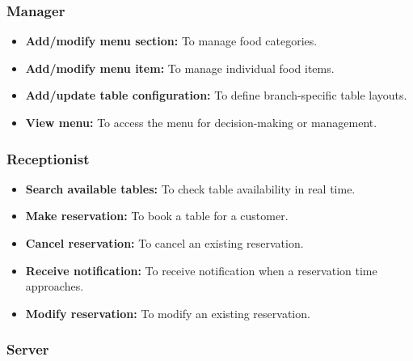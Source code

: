 \subsubsection{Manager}\label{jgQsx495o6YJeOs4ce3vR}

\begin{itemize}
\item
\protect{}\label{5SGHT-CP0vpDz7Rw-SgeX}
\textbf{Add/modify menu section:} To manage food categories.
\item
\protect{}\label{_JZ66uNrzo9X8_sIN7jDQ}
\textbf{Add/modify menu item:} To manage individual food items.
\item
\protect{}\label{HjCiYsiJg2OsqkMC9UfKi}
\textbf{Add/update table configuration:} To define branch-specific table layouts.
\item
\protect{}\label{zDsKv5REEl-dg4h41iT51}
\textbf{View menu:} To access the menu for decision-making or management.
\end{itemize}

\subsubsection{Receptionist}\label{fA9KqAqMr9W1m9H0SJjck}

\begin{itemize}
\item
\protect{}\label{Qt6iuvdptA9ENNh14ioHK}
\textbf{Search available tables:} To check table availability in real time.
\item
\protect{}\label{-F8HXIsH_SrwmAZCqnrOQ}
\textbf{Make reservation:} To book a table for a customer.
\item
\protect{}\label{MzsGDsfxMHckXuqGziL59}
\textbf{Cancel reservation:} To cancel an existing reservation.
\item
\protect{}\label{Vqa1_6BgGIILAR9Z5QIti}
\textbf{Receive notification:} To receive notification when a reservation time approaches.
\item
\protect{}\label{r2iqcjXCyAVe9sg1rVk33}
\textbf{Modify reservation:} To modify an existing reservation.
\end{itemize}

\subsubsection{Server}\label{VhWc7GqKkysxdubbw58pa}

